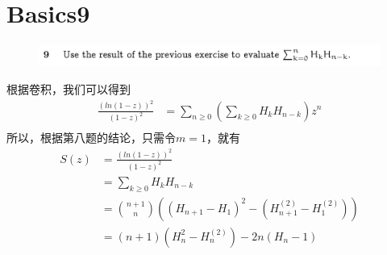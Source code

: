 \documentclass[]{article}
\begin{document}
\section*{Basics9}
\begin{figure}[H]
\includegraphics[scale = 0.3]{2023-04-20-12-38-25.png}
\end{figure}
根据卷积，我们可以得到
\begin{align}
    \frac{(ln(1-z))^2}{(1-z)^2} &= \sum_{n\ge 0}(\sum_{k \ge 0}H_{k}H_{n-k})z^n\\
\end{align}
所以，根据第八题的结论，只需令$m=1$，就有
\begin{align}
    [z^n]S(z) &= \frac{(ln(1-z))^2}{(1-z)^2}\\
    &=\sum_{k \ge 0}H_{k}H_{n-k}\\
    &=\binom{n+1}{n}((H_{n+1} - H_{1})^2 - (H^{(2)}_{n+1}-H^{(2)}_{1}))\\
    &=(n+1)(H_{n}^2 - H^{(2)}_{n})-2n(H_{n} - 1)\\
\end{align}
\end{document}
